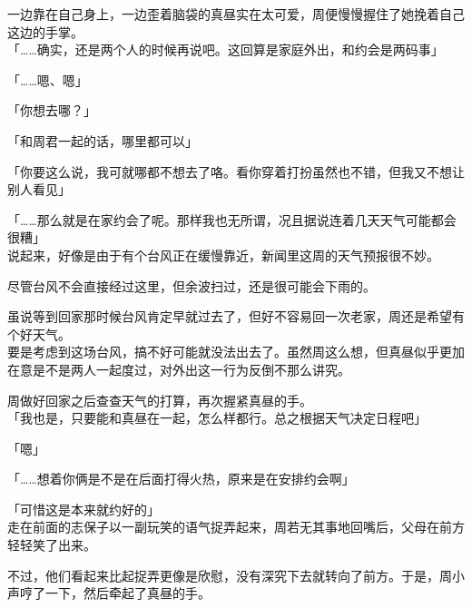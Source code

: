 一边靠在自己身上，一边歪着脑袋的真昼实在太可爱，周便慢慢握住了她挽着自己这边的手掌。\\%

「……确实，还是两个人的时候再说吧。这回算是家庭外出，和约会是两码事」

「……嗯、嗯」

「你想去哪？」

「和周君一起的话，哪里都可以」

「你要这么说，我可就哪都不想去了咯。看你穿着打扮虽然也不错，但我又不想让别人看见」

「……那么就是在家约会了呢。那样我也无所谓，况且据说连着几天天气可能都会很糟」\\

说起来，好像是由于有个台风正在缓慢靠近，新闻里这周的天气预报很不妙。

尽管台风不会直接经过这里，但余波扫过，还是很可能会下雨的。

虽说等到回家那时候台风肯定早就过去了，但好不容易回一次老家，周还是希望有个好天气。\\

要是考虑到这场台风，搞不好可能就没法出去了。虽然周这么想，但真昼似乎更加在意是不是两人一起度过，对外出这一行为反倒不那么讲究。

周做好回家之后查查天气的打算，再次握紧真昼的手。\\

「我也是，只要能和真昼在一起，怎么样都行。总之根据天气决定日程吧」

「嗯」

「……想着你俩是不是在后面打得火热，原来是在安排约会啊」

「可惜这是本来就约好的」\\

走在前面的志保子以一副玩笑的语气捉弄起来，周若无其事地回嘴后，父母在前方轻轻笑了出来。

不过，他们看起来比起捉弄更像是欣慰，没有深究下去就转向了前方。于是，周小声哼了一下，然后牵起了真昼的手。

